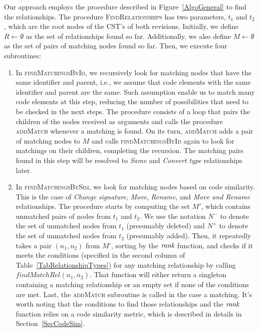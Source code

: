 Our approach employs the procedure described in Figure~\ref{AlgoGeneral} to find the relationships.
The procedure \textsc{FindRelationships} has two parameters, $t_1$ and $t_2$, which are the root nodes of the CST's of both revisions.
Initially, we define $R \gets \emptyset$ as the set of relationships found so far.
Additionally, we also define $M \gets \emptyset$ as the set of pairs of matching nodes found so far.
Then, we execute four subroutines:
\begin{enumerate}

\item In \textsc{findMatchingsById}, we recursively look for matching nodes that have the same identifier and parent, i.e., we assume that code elements with the same identifier and parent are the same.
Such assumption enable us to match many code elements at this step, reducing the number of possibilities that need to be checked in the next steps.
The procedure consists of a loop that pairs the children of the nodes received as arguments and calls the procedure \textsc{addMatch} whenever a matching is found.
On its turn, \textsc{addMatch} adds a pair of matching nodes to $M$ and calls \textsc{findMatchingsById} again to look for matchings on their children, completing the recursion.
The matching pairs found in this step will be resolved to \textit{Same} and \textit{Convert type} relationships later.

\item In \textsc{findMatchingsBySim}, we look for matching nodes based on code similarity.
This is the case of \textit{Change signature}, \textit{Move}, \textit{Rename}, and \textit{Move and Rename} relationships.
The procedure starts by computing the set $M'$, which contains unmatched pairs of nodes from $t_1$ and $t_2$.
We use the notation $N^-$ to denote the set of unmatched nodes from $t_1$ (presumably deleted) and $N^+$ to denote the set of unmatched nodes from $t_2$ (presumably added).
Then, it repeatedly takes a pair $(n_1, n_2)$ from $M'$, sorting by the $\operatorname{\mathit{rank}}$ function, and checks if it meets the conditions (specified in the second column of Table~\ref{TabRelationshipTypes}) for any matching relationship by calling $\mathit{findMatchRel}(n_1, n_2)$.
That function will either return a singleton containing a matching relationship or an empty set if none of the conditions are met.
Last, the \textsc{addMatch} subroutine is called in the case a matching.
It's worth noting that the conditions to find those relationships and the $\operatorname{\mathit{rank}}$ function relies on a code similarity metric, which is described in details in Section~\ref{SecCodeSim}.


\end{enumerate}
